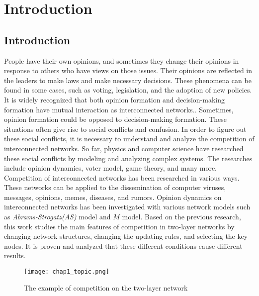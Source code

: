 
\chapter{Introduction}
\label{chap1}
\section{Introduction}
People have their own opinions, and sometimes they change their opinions in response to others who have views on those issues. Their opinions are reflected in the leaders to make laws and make necessary decisions. These phenomena can be found in some cases, such as voting, legislation, and the adoption of new policies. It is widely recognized that both opinion formation and decision-making formation have mutual interaction as interconnected networks.\parencite{mikko2014, danziger2019, newman2010, boccaletti2014, domenico2013, tomasini2015, namkhanhvu2017}. Sometimes, opinion formation could be opposed to decision-making formation. These situations often give rise to social conflicts and confusion. In order to figure out these social conflicts, it is necessary to understand and analyze the competition of interconnected networks. So far, physics and computer science have researched these social conflicts by modeling and analyzing complex systems\parencite{fangwu2004, zuev2012, laguna2004, masuda2014}. The researches include opinion dynamics, voter model, game theory, and many more.\parencite{smyrnakis2019, bianconi2018, redner2017, haibo2017, amato2017, quattrociocchi2014, casey2009} 
Competition of interconnected networks has been researched in various ways. These networks can be applied to the dissemination of computer viruses, messages, opinions, memes, diseases, and rumors\parencite{hua2014,shenyu2018, zhou2018, alvarez2016,gomez2015,diep2017,rocca2014,velasquez2018}. Opinion dynamics on interconnected networks has been investigated with various network models such as \textit{Abrams-Strogatz(AS)} model\parencite{abrams2003,vazquez2010} and $M$ model\parencite{rocca2014}.  Based on the previous research, this work studies the main features of competition in two-layer networks by changing network structures, changing the updating rules, and selecting the key nodes. It is proven and analyzed that these different conditions cause different results.
\begin{figure}[!htb]
	\centering
	\texttt{[image: chap1\_topic.png]}
	\caption{The example of competition on the two-layer network}
	\label{chap1_topic}
\end{figure}

